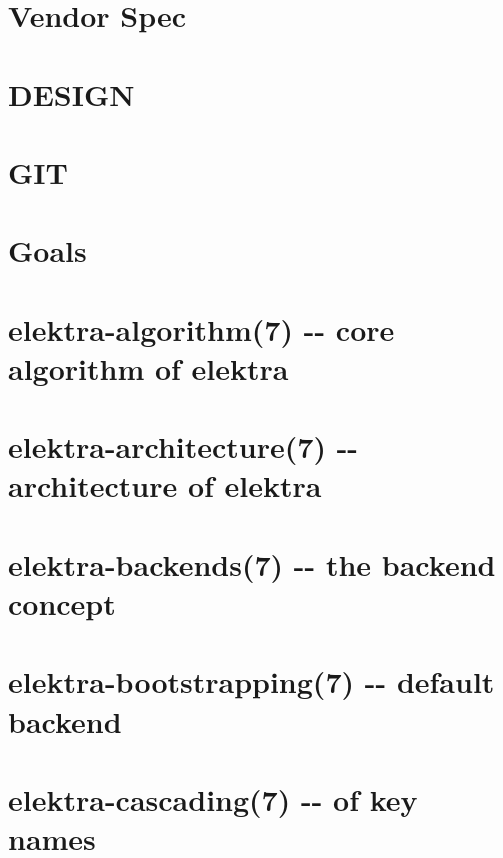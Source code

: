 \documentclass[twoside]{book}
\newcommand{\+}{\discretionary{\mbox{\scriptsize$\hookleftarrow$}}{}{}}
\begin{document}
\chapter{Vendor Spec}
\label{doc_decisions_vendor_spec_md}
\hypertarget{doc_decisions_vendor_spec_md}{}

\chapter{D\+E\+S\+I\+G\+N}
\label{doc_DESIGN_md}
\hypertarget{doc_DESIGN_md}{}

\chapter{G\+I\+T}
\label{doc_GIT_md}
\hypertarget{doc_GIT_md}{}

\chapter{Goals}
\label{doc_GOALS_md}
\hypertarget{doc_GOALS_md}{}

\chapter{elektra-\/algorithm(7) -\/-\/ core algorithm of elektra}
\label{md_doc_help_elektra-algorithm}
\hypertarget{md_doc_help_elektra-algorithm}{}

\chapter{elektra-\/architecture(7) -\/-\/ architecture of elektra}
\label{md_doc_help_elektra-architecture}
\hypertarget{md_doc_help_elektra-architecture}{}

\chapter{elektra-\/backends(7) -\/-\/ the backend concept}
\label{md_doc_help_elektra-backends}
\hypertarget{md_doc_help_elektra-backends}{}

\chapter{elektra-\/bootstrapping(7) -\/-\/ default backend}
\label{md_doc_help_elektra-bootstrapping}
\hypertarget{md_doc_help_elektra-bootstrapping}{}

\chapter{elektra-\/cascading(7) -\/-\/ of key names}
\label{md_doc_help_elektra-cascading}
\hypertarget{md_doc_help_elektra-cascading}{}

\end{document}
